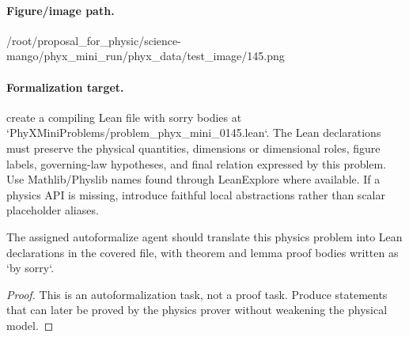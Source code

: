 \paragraph{Figure/image path.}
/root/proposal\_for\_physic/science-mango/phyx\_mini\_run/phyx\_data/test\_image/145.png

\paragraph{Formalization target.}
create a compiling Lean file with sorry bodies at `PhyXMiniProblems/problem\_phyx\_mini\_0145.lean`. The Lean declarations must preserve the physical quantities, dimensions or dimensional roles, figure labels, governing-law hypotheses, and final relation expressed by this problem.
Use Mathlib/Physlib names found through LeanExplore where available. If a physics API is missing, introduce faithful local abstractions rather than scalar placeholder aliases.

\begin{theorem}
\label{thm:physics:phyx_mini_0145:target}
The assigned autoformalize agent should translate this physics problem into Lean declarations in the covered file, with theorem and lemma proof bodies written as `by sorry`.
\end{theorem}
\begin{proof}
This is an autoformalization task, not a proof task. Produce statements that can later be proved by the physics prover without weakening the physical model.
\end{proof}

